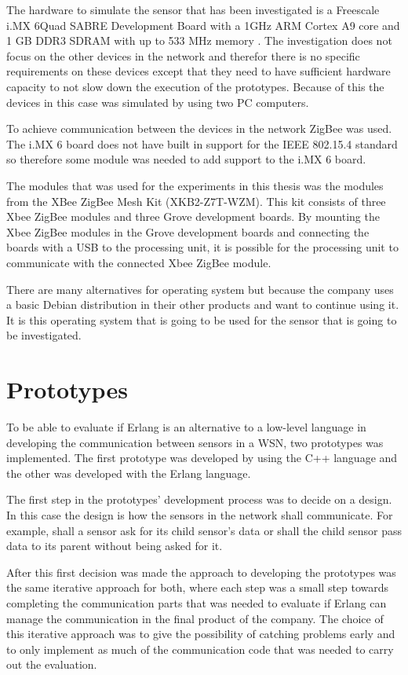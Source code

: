 The hardware to simulate the sensor that has been investigated is a Freescale i.MX 6Quad SABRE Development Board with a 1GHz ARM Cortex A9 core and 1 GB DDR3 SDRAM with up to 533 MHz memory \citep{nxp2012board}. The investigation does not focus on the other devices in the network and therefor there is no specific requirements on these devices except that they need to have sufficient hardware capacity to not slow down the execution of the prototypes. Because of this the devices in this case was simulated by using two PC computers.  

To achieve communication between the devices in the network ZigBee was used. The i.MX 6 board does not have built in support for the IEEE 802.15.4 standard so therefore some module was needed to add support to the i.MX 6 board.  

The modules that was used for the experiments in this thesis was the modules from the XBee ZigBee Mesh Kit (XKB2-Z7T-WZM). This kit consists of three Xbee ZigBee modules and three Grove development boards. By mounting the Xbee ZigBee modules in the Grove development boards and connecting the boards with a USB to the processing unit, it is possible for the processing unit to communicate with the connected Xbee ZigBee module. 
 
There are many alternatives for operating system but because the company uses a basic Debian distribution in their other products and want to continue using it. It is this operating system that is going to be used for the sensor that is going to be investigated.

\section{Prototypes}
To be able to evaluate if Erlang is an alternative to a low-level language in developing the communication between sensors in a WSN, two prototypes was implemented. The first prototype was developed by using the C++ language and the other was developed with the Erlang language. 

The first step in the prototypes’ development process was to decide on a design. In this case the design is how the sensors in the network shall communicate. For example, shall a sensor ask for its child sensor’s data or shall the child sensor pass data to its parent without being asked for it.

After this first decision was made the approach to developing the prototypes was the same iterative approach for both, where each step was a small step towards completing the communication parts that was needed to evaluate if Erlang can manage the communication in the final product of the company. The choice of this iterative approach was to give the possibility of catching problems early and to only implement as much of the communication code that was needed to carry out the evaluation.

